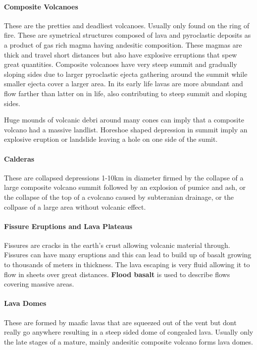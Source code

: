 \documentclass{article}
\begin{document}
\paragraph{Composite Volcanoes} %
\label{par:composite_volcanoes}
These are the pretties and deadliest volcanoes. Usually only found on the ring of fire. These are symetrical structures composed of lava and pyroclastic deposits as a product of gas rich magma having andesitic composition. These magmas are thick and travel short distances but also have explosive erruptions that spew great quantities. Composite volcanoes have very steep summit and gradually sloping sides due to larger pyroclastic ejecta gathering around the summit while smaller ejecta cover a larger area. In its early life lavas are more abundant and flow farther than latter on in life, also contributing to steep summit and sloping sides.

Huge mounds of volcanic debri around many cones can imply that a composite volcano had a massive landlist. Horeshoe shaped depression in summit imply an explosive eruption or landslide leaving a hole on one side of the sumit.


\paragraph{Calderas} %
\label{par:calderas}
These are collapsed depressions 1-10km in diameter firmed by the collapse of a large composite volcano summit followed by an explosion of pumice and ash, or the collapse of the top of a \smallskiphield cvolcano caused by subteranian drainage, or the collpase of a large area without volcanic effect.

\paragraph{Fissure Eruptions and Lava Plateaus} %
\label{par:fissure_eruptions_and_lava_plateaus}
Fissures are cracks in the earth's crust allowing volcanic material through. Fissures can have many eruptions and this can lead to build up of basalt growing to thousands of meters in thickness. The lava escaping is very fluid allowing it to flow in sheets over great distances. \textbf{Flood basalt} is used to describe flows covering massive areas.

\paragraph{Lava Domes} %
\label{par:lava_domes}
These are formed by maafic lavas that are squeezed out of the vent but dont really go anywhere resulting in a steep sided dome of congealed lava. Usually only the late stages of a mature, mainly andesitic composite volcano forms lava domes.
\end{document}
